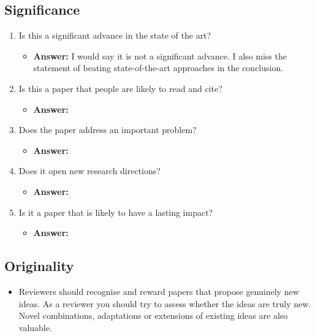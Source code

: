 \documentclass[a4paper]{article}
\begin{document}
\subsection{Significance}

\begin{enumerate}[label=(\alph*)]
	\item Is this a significant advance in the state of the art?
		\begin{itemize}
			\item \textbf{Answer:} I would say it is not a significant advance. I also miss the statement of beating state-of-the-art approaches in the conclusion.
		\end{itemize}			
	
	\item Is this a paper that people are likely to read and cite?
		\begin{itemize}
			\item \textbf{Answer:}	
		\end{itemize}			
	
	\item Does the paper address an important problem?
		\begin{itemize}
			\item \textbf{Answer:}	
		\end{itemize}			
	
	\item Does it open new research directions?
		\begin{itemize}
			\item \textbf{Answer:}	
		\end{itemize}			
	
	\item Is it a paper that is likely to have a lasting impact?
		\begin{itemize}
			\item \textbf{Answer:}	
		\end{itemize}		
\end{enumerate}

\subsection{Originality}

\begin{itemize}
	\item Reviewers should recognise and reward papers that propose genuinely new ideas. As a reviewer you should try to assess whether the ideas are truly new. Novel combinations, adaptations or extensions of existing ideas are also valuable.
\end{itemize}
\end{document}
